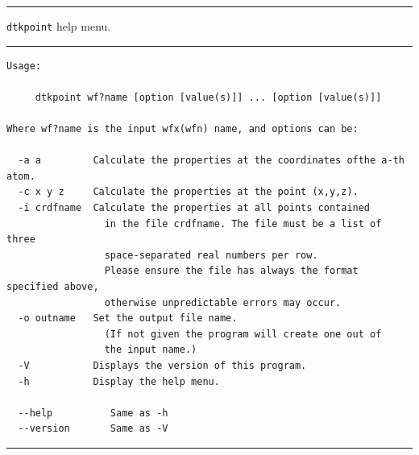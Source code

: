 \rule{\textwidth}{1pt}
{\center\texttt{dtkpoint} help menu.\\}
\rule{\textwidth}{1pt}
\begin{small}
\begin{verbatim}
Usage:

     dtkpoint wf?name [option [value(s)]] ... [option [value(s)]]

Where wf?name is the input wfx(wfn) name, and options can be:

  -a a         Calculate the properties at the coordinates ofthe a-th atom.
  -c x y z     Calculate the properties at the point (x,y,z).
  -i crdfname  Calculate the properties at all points contained
                 in the file crdfname. The file must be a list of three 
                 space-separated real numbers per row.
                 Please ensure the file has always the format specified above,
                 otherwise unpredictable errors may occur.
  -o outname   Set the output file name.
                 (If not given the program will create one out of
                 the input name.)
  -V           Displays the version of this program.
  -h           Display the help menu.

  --help          Same as -h
  --version       Same as -V
\end{verbatim}
\end{small}
\rule{\textwidth}{1pt}

